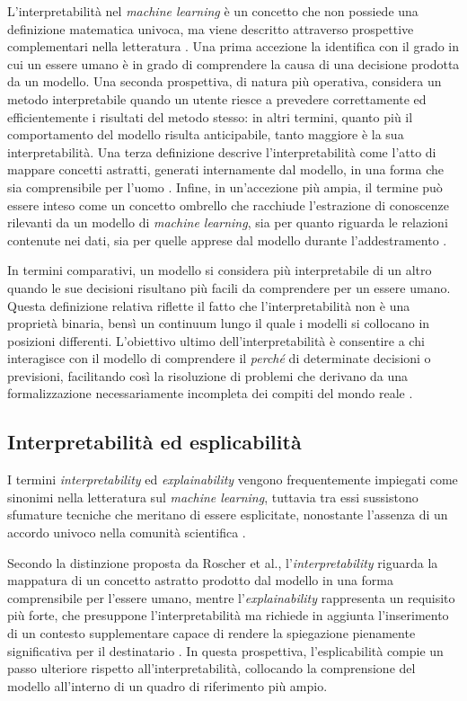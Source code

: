 L'interpretabilità nel \textit{machine learning} è un concetto che non possiede una definizione matematica univoca, ma viene descritto attraverso prospettive complementari nella letteratura \cite{molnar2025interpretable}. Una prima accezione la identifica con il grado in cui un essere umano è in grado di comprendere la causa di una decisione prodotta da un modello. Una seconda prospettiva, di natura più operativa, considera un metodo interpretabile quando un utente riesce a prevedere correttamente ed efficientemente i risultati del metodo stesso: in altri termini, quanto più il comportamento del modello risulta anticipabile, tanto maggiore è la sua interpretabilità. Una terza definizione descrive l'interpretabilità come l'atto di mappare concetti astratti, generati internamente dal modello, in una forma che sia comprensibile per l'uomo \cite{roscher2020explainable}. Infine, in un'accezione più ampia, il termine può essere inteso come un concetto ombrello che racchiude l'estrazione di conoscenze rilevanti da un modello di \textit{machine learning}, sia per quanto riguarda le relazioni contenute nei dati, sia per quelle apprese dal modello durante l'addestramento \cite{molnar2025interpretable}.

In termini comparativi, un modello si considera più interpretabile di un altro quando le sue decisioni risultano più facili da comprendere per un essere umano. Questa definizione relativa riflette il fatto che l'interpretabilità non è una proprietà binaria, bensì un continuum lungo il quale i modelli si collocano in posizioni differenti. L'obiettivo ultimo dell'interpretabilità è consentire a chi interagisce con il modello di comprendere il \textit{perché} di determinate decisioni o previsioni, facilitando così la risoluzione di problemi che derivano da una formalizzazione necessariamente incompleta dei compiti del mondo reale \cite{molnar2025interpretable}.

\subsection{Interpretabilità ed esplicabilità}

I termini \textit{interpretability} ed \textit{explainability} vengono frequentemente impiegati come sinonimi nella letteratura sul \textit{machine learning}, tuttavia tra essi sussistono sfumature tecniche che meritano di essere esplicitate, nonostante l'assenza di un accordo univoco nella comunità scientifica \cite{molnar2025interpretable}.

Secondo la distinzione proposta da Roscher et al., l'\textit{interpretability} riguarda la mappatura di un concetto astratto prodotto dal modello in una forma comprensibile per l'essere umano, mentre l'\textit{explainability} rappresenta un requisito più forte, che presuppone l'interpretabilità ma richiede in aggiunta l'inserimento di un contesto supplementare capace di rendere la spiegazione pienamente significativa per il destinatario \cite{roscher2020explainable}. In questa prospettiva, l'esplicabilità compie un passo ulteriore rispetto all'interpretabilità, collocando la comprensione del modello all'interno di un quadro di riferimento più ampio.

